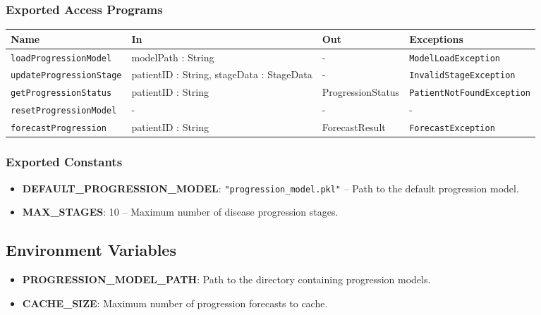 \documentclass[12pt, titlepage]{article}
\begin{document}
\subsubsection{Exported Access Programs}
\begin{center}
  \renewcommand{\arraystretch}{1.2}
  \begin{tabularx}{\textwidth}{|l|X|X|X|}
    \hline
    \textbf{Name} & \textbf{In} & \textbf{Out} & \textbf{Exceptions} \\
    \hline 
    \texttt{loadProgressionModel} & modelPath : String & - & \texttt{ModelLoadException} \\
    \hline
    \texttt{updateProgressionStage} & patientID : String, stageData : StageData & - & \texttt{InvalidStageException} \\
    \hline
    \texttt{getProgressionStatus} & patientID : String & ProgressionStatus & \texttt{PatientNotFoundException} \\
    \hline
    \texttt{resetProgressionModel} & - & - & - \\
    \hline
    \texttt{forecastProgression} & patientID : String & ForecastResult & \texttt{ForecastException} \\
    \hline
  \end{tabularx}
\end{center}

\subsubsection{Exported Constants}
\begin{itemize}
    \item \textbf{DEFAULT\_PROGRESSION\_MODEL}: \texttt{"progression\_model.pkl"} -- Path to the default progression model.
    \item \textbf{MAX\_STAGES}: 10 -- Maximum number of disease progression stages.
\end{itemize}

\subsection{Environment Variables}
\begin{itemize}
    \item \textbf{PROGRESSION\_MODEL\_PATH}: Path to the directory containing progression models.
    \item \textbf{CACHE\_SIZE}: Maximum number of progression forecasts to cache.
\end{itemize}
\end{document}
